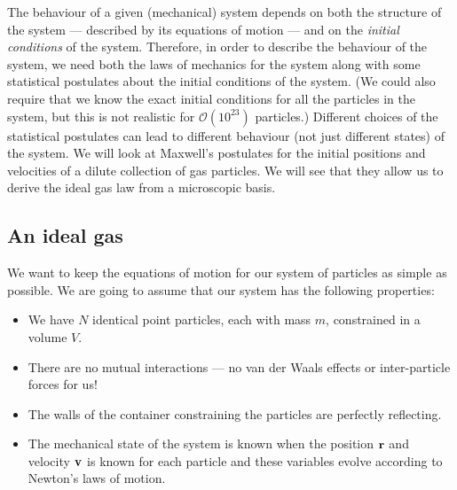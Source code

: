 \documentclass{article}
\begin{document}
The behaviour of a given (mechanical) system depends on both the structure of the system --- described by its equations of motion --- and on the \emph{initial conditions} of the system. Therefore, in order to describe the behaviour of the system, we need both the laws of mechanics for the system along with some statistical postulates about the initial conditions of the system. (We could also require that we know the exact initial conditions for all the particles in the system, but this is not realistic for $\mathcal{O}(10^{23})$ particles.) Different choices of the statistical postulates can lead to different behaviour (not just different states) of the system. We will look at Maxwell's postulates for the initial positions and velocities of a dilute collection of gas particles. We will see that they allow us to derive the ideal gas law from a microscopic basis.

\subsection{An ideal gas}
We want to keep the equations of motion for our system of particles as simple as possible. We are going to assume   that our system has the following properties:
\begin{itemize}
\item We have $N$ identical  point particles, each with mass $m$, constrained in a volume $V$.
\item There are no mutual interactions --- no van der Waals effects or inter-particle forces for us!
\item The walls of the container constraining the particles are perfectly reflecting.
\item The mechanical state of the system is known when the position $\bf r$ and velocity $\bf v$ is known for each particle and these variables evolve according to Newton's laws of motion.
\end{itemize}
\end{document}

